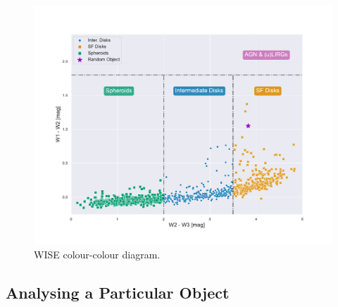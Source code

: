 \documentclass[letterpaper, oneside]{article}
\begin{document}
\begin{figure}[h]
	\centering
	\includegraphics[width=1.1\textwidth]{../wise_color_color.pdf}
	\caption{WISE colour-colour diagram.}
	\label{fig:wise_colours}
\end{figure}

\subsection{Analysing a Particular Object}






\end{document}
